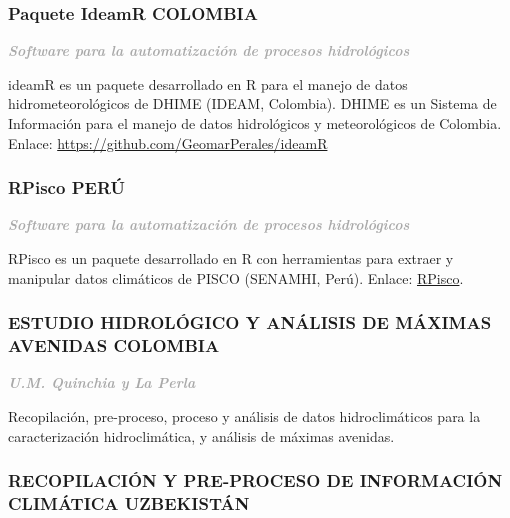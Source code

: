 \documentclass[
  10,
]{article}
\begin{document}
\hypertarget{paquete-ideamr-colombia}{%
\subsubsection{Paquete IdeamR \textbar{}
COLOMBIA}\label{paquete-ideamr-colombia}}

\textcolor{darkgray}{\textbf{\emph{Software para la automatización de procesos hidrológicos}}}

ideamR es un paquete desarrollado en R para el manejo de datos
hidrometeorológicos de DHIME (IDEAM, Colombia). DHIME es un Sistema de
Información para el manejo de datos hidrológicos y meteorológicos de
Colombia. Enlace: \url{https://github.com/GeomarPerales/ideamR}

\newpage

\hypertarget{rpisco-peruxfa}{%
\subsubsection{RPisco \textbar{} PERÚ}\label{rpisco-peruxfa}}

\textcolor{darkgray}{\textbf{\emph{Software para la automatización de procesos hidrológicos}}}

RPisco es un paquete desarrollado en R con herramientas para extraer y
manipular datos climáticos de PISCO (SENAMHI, Perú). Enlace:
\href{https://github.com/GeomarPerales/RPisco}{RPisco}.

\hypertarget{estudio-hidroluxf3gico-y-anuxe1lisis-de-muxe1ximas-avenidas-colombia}{%
\subsubsection{ESTUDIO HIDROLÓGICO Y ANÁLISIS DE MÁXIMAS AVENIDAS
\textbar{}
COLOMBIA}\label{estudio-hidroluxf3gico-y-anuxe1lisis-de-muxe1ximas-avenidas-colombia}}

\textcolor{darkgray}{\textbf{\emph{U.M. Quinchia y La Perla}}}

Recopilación, pre-proceso, proceso y análisis de datos hidroclimáticos
para la caracterización hidroclimática, y análisis de máximas avenidas.

\hypertarget{recopilaciuxf3n-y-pre-proceso-de-informaciuxf3n-climuxe1tica-uzbekistuxe1n}{%
\subsubsection{RECOPILACIÓN Y PRE-PROCESO DE INFORMACIÓN CLIMÁTICA
\textbar{}
UZBEKISTÁN}\label{recopilaciuxf3n-y-pre-proceso-de-informaciuxf3n-climuxe1tica-uzbekistuxe1n}}
\end{document}
